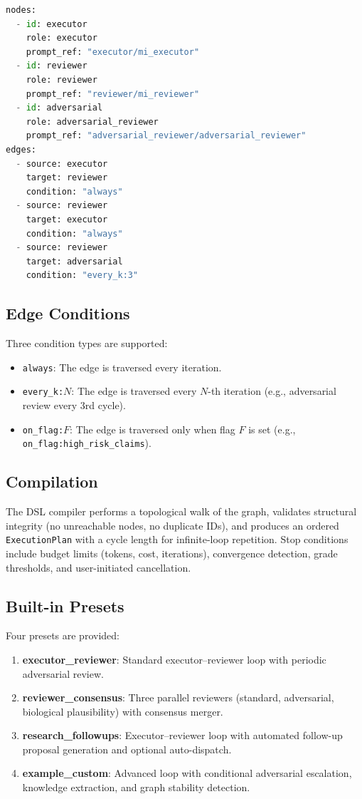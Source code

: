 \documentclass[11pt,a4paper]{article}
\begin{document}
\begin{lstlisting}[language=Python,caption={Excerpt from the \texttt{executor\_reviewer} loop definition.}]
nodes:
  - id: executor
    role: executor
    prompt_ref: "executor/mi_executor"
  - id: reviewer
    role: reviewer
    prompt_ref: "reviewer/mi_reviewer"
  - id: adversarial
    role: adversarial_reviewer
    prompt_ref: "adversarial_reviewer/adversarial_reviewer"
edges:
  - source: executor
    target: reviewer
    condition: "always"
  - source: reviewer
    target: executor
    condition: "always"
  - source: reviewer
    target: adversarial
    condition: "every_k:3"
\end{lstlisting}

\subsection{Edge Conditions}
Three condition types are supported:
\begin{itemize}[leftmargin=*]
  \item \texttt{always}: The edge is traversed every iteration.
  \item \texttt{every\_k:$N$}: The edge is traversed every $N$-th iteration (e.g., adversarial review every 3rd cycle).
  \item \texttt{on\_flag:$F$}: The edge is traversed only when flag $F$ is set (e.g., \texttt{on\_flag:high\_risk\_claims}).
\end{itemize}

\subsection{Compilation}
The DSL compiler performs a topological walk of the graph, validates structural integrity (no unreachable nodes, no duplicate IDs), and produces an ordered \texttt{ExecutionPlan} with a cycle length for infinite-loop repetition.
Stop conditions include budget limits (tokens, cost, iterations), convergence detection, grade thresholds, and user-initiated cancellation.

\subsection{Built-in Presets}
Four presets are provided:
\begin{enumerate}[leftmargin=*]
  \item \textbf{executor\_reviewer}: Standard executor--reviewer loop with periodic adversarial review.
  \item \textbf{reviewer\_consensus}: Three parallel reviewers (standard, adversarial, biological plausibility) with consensus merger.
  \item \textbf{research\_followups}: Executor--reviewer loop with automated follow-up proposal generation and optional auto-dispatch.
  \item \textbf{example\_custom}: Advanced loop with conditional adversarial escalation, knowledge extraction, and graph stability detection.
\end{enumerate}
\end{document}
